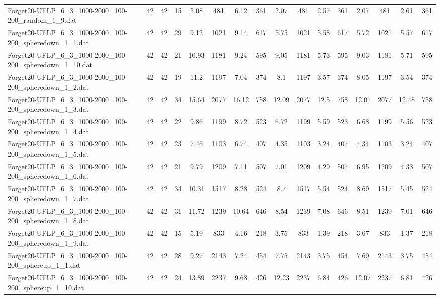 \begin{sidewaystable}[!ht]
{\begin{tabular}{lccccccccccccccc}
Forget20-UFLP\_6\_3\_1000-2000\_100-200\_random\_1\_9.dat & 42 & 42 & 15 & 5.08 & 481 & 6.12 & 361 & 2.07 & 481 & 2.57 & 361 & 2.07 & 481 & 2.61 & 361 \\
Forget20-UFLP\_6\_3\_1000-2000\_100-200\_spheredown\_1\_1.dat & 42 & 42 & 29 & 9.12 & 1021 & 9.14 & 617 & 5.75 & 1021 & 5.58 & 617 & 5.72 & 1021 & 5.57 & 617 \\
Forget20-UFLP\_6\_3\_1000-2000\_100-200\_spheredown\_1\_10.dat & 42 & 42 & 21 & 10.93 & 1181 & 9.24 & 595 & 9.05 & 1181 & 5.73 & 595 & 9.03 & 1181 & 5.71 & 595 \\
Forget20-UFLP\_6\_3\_1000-2000\_100-200\_spheredown\_1\_2.dat & 42 & 42 & 19 & 11.2 & 1197 & 7.04 & 374 & 8.1 & 1197 & 3.57 & 374 & 8.05 & 1197 & 3.54 & 374 \\
Forget20-UFLP\_6\_3\_1000-2000\_100-200\_spheredown\_1\_3.dat & 42 & 42 & 34 & 15.64 & 2077 & 16.12 & 758 & 12.09 & 2077 & 12.5 & 758 &  \textcolor{blue2}{12.01} & 2077 & 12.48 & 758 \\
Forget20-UFLP\_6\_3\_1000-2000\_100-200\_spheredown\_1\_4.dat & 42 & 42 & 22 & 9.86 & 1199 & 8.72 & 523 & 6.72 & 1199 & 5.59 & 523 & 6.68 & 1199 & 5.56 & 523 \\
Forget20-UFLP\_6\_3\_1000-2000\_100-200\_spheredown\_1\_5.dat & 42 & 42 & 23 & 7.46 & 1103 & 6.74 & 407 & 4.35 & 1103 & 3.24 & 407 & 4.34 & 1103 & 3.24 & 407 \\
Forget20-UFLP\_6\_3\_1000-2000\_100-200\_spheredown\_1\_6.dat & 42 & 42 & 21 & 9.79 & 1209 & 7.11 & 507 & 7.01 & 1209 & 4.29 & 507 & 6.95 & 1209 & 4.33 & 507 \\
Forget20-UFLP\_6\_3\_1000-2000\_100-200\_spheredown\_1\_7.dat & 42 & 42 & 34 & 10.31 & 1517 & 8.28 & 524 & 8.7 & 1517 & 5.54 & 524 & 8.69 & 1517 &  \textcolor{blue2}{5.45} & 524 \\
Forget20-UFLP\_6\_3\_1000-2000\_100-200\_spheredown\_1\_8.dat & 42 & 42 & 31 & 11.72 & 1239 & 10.64 & 646 & 8.54 & 1239 & 7.08 & 646 & 8.51 & 1239 &  \textcolor{blue2}{7.01} & 646 \\
Forget20-UFLP\_6\_3\_1000-2000\_100-200\_spheredown\_1\_9.dat & 42 & 42 & 15 & 5.19 & 833 & 4.16 & 218 & 3.75 & 833 & 1.39 & 218 & 3.67 & 833 & 1.37 & 218 \\
Forget20-UFLP\_6\_3\_1000-2000\_100-200\_sphereup\_1\_1.dat & 42 & 42 & 28 & 9.27 & 2143 & 7.24 & 454 & 7.75 & 2143 & 3.75 & 454 & 7.69 & 2143 & 3.75 & 454 \\
Forget20-UFLP\_6\_3\_1000-2000\_100-200\_sphereup\_1\_10.dat & 42 & 42 & 24 & 13.89 & 2237 & 9.68 & 426 & 12.23 & 2237 & 6.84 & 426 & 12.07 & 2237 & 6.81 & 426 \\

\end{tabular}}
\end{sidewaystable}
